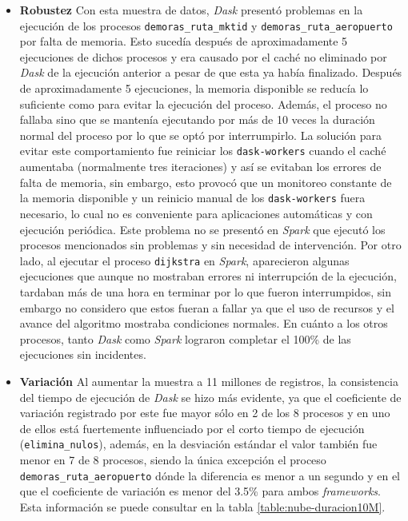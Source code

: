 \begin{itemize}
	\item \textbf{Robustez} Con esta muestra de datos, \textit{Dask} presentó problemas en la ejecución de los procesos \texttt{demoras\_ruta\_mktid} y \texttt{demoras\_ruta\_aeropuerto} por falta de memoria. Esto sucedía después de aproximadamente 5 ejecuciones de dichos procesos y era causado por el caché no eliminado por \textit{Dask} de la ejecución anterior a pesar de que esta ya había finalizado. Después de aproximadamente 5 ejecuciones, la memoria disponible se reducía lo suficiente como para evitar la ejecución del proceso. Además, el proceso no fallaba sino que se mantenía ejecutando por más de 10 veces la duración normal del proceso por lo que se optó por interrumpirlo. La solución para evitar este comportamiento fue reiniciar los \texttt{dask-workers} cuando el caché aumentaba (normalmente tres iteraciones) y así se evitaban los errores de falta de memoria, sin embargo, esto provocó que un monitoreo constante de la memoria disponible y un reinicio manual de los \texttt{dask-workers} fuera necesario, lo cual no es conveniente para aplicaciones automáticas y con ejecución periódica. Este problema no se presentó en \textit{Spark} que ejecutó los procesos mencionados sin problemas y sin necesidad de intervención. Por otro lado, al ejecutar el proceso \texttt{dijkstra} en \textit{Spark}, aparecieron algunas ejecuciones que aunque no mostraban errores ni interrupción de la ejecución, tardaban más de una hora en terminar por lo que fueron interrumpidos, sin embargo no considero que estos fueran a fallar ya que el uso de recursos y el avance del algoritmo mostraba condiciones normales. En cuánto a los otros procesos, tanto \textit{Dask} como \textit{Spark} lograron completar el 100\% de las ejecuciones sin incidentes.

	\item \textbf{Variación} Al aumentar la muestra a 11 millones de registros, la consistencia del tiempo de ejecución de \textit{Dask} se hizo más evidente, ya que el coeficiente de variación registrado por este fue mayor sólo en 2 de los 8 procesos y en uno de ellos está fuertemente influenciado por el corto tiempo de ejecución (\texttt{elimina\_nulos}), además, en la desviación estándar el valor también fue menor en 7 de 8 procesos, siendo la única excepción el proceso \texttt{demoras\_ruta\_aeropuerto} dónde la diferencia es menor a un segundo y en el que el coeficiente de variación es menor del 3.5\% para ambos \textit{frameworks}. Esta información se puede consultar en la tabla \ref{table:nube-duracion10M}.
	

\end{itemize}
